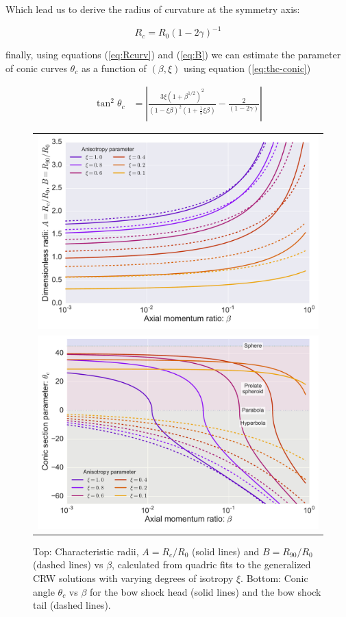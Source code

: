 Which lead us to derive the radius of curvature at the symmetry axis:

\begin{equation}
R_c = R_0\left(1-2\gamma\right)^{-1}
\label{eq:Rcurv}
\end{equation}

finally, using equations (\ref{eq:Rcurv}) and (\ref{eq:B}) we can estimate the parameter of conic curves $\theta_c$ as a function of $(\beta,\xi)$ using equation (\ref{eq:thc-conic})

\begin{align}
\tan^2\theta_c &= \left| \frac{3\xi\left(1+\beta^{1/2}\right)^2}{\left(1-\xi\beta\right)^2\left(1+\frac{1}{5}\xi\beta\right)}-\frac{2}{\left(1-2\gamma\right)}\right| 
\label{eq:thc-CRW}
\end{align}

\begin{figure}
\begin{tabular}{c}
\includegraphics[width=\linewidth]{figs/AB-beta-log} \\
\includegraphics[width=\linewidth]{figs/thc-beta-log}
\end{tabular}
\caption{Top: Characteristic radii, $A = R_c/R_0$ (solid lines) and $B
  = R_{90}/R_0$ (dashed lines)
  vs $\beta$, calculated from quadric fits to the generalized CRW
  solutions with varying degrees of isotropy $\xi$.  Bottom: Conic
  angle $\theta_c$ vs $\beta$ for the bow 
  shock head (solid lines) and the bow shock tail (dashed lines).}
\label{fig:rad-beta}
\end{figure}


